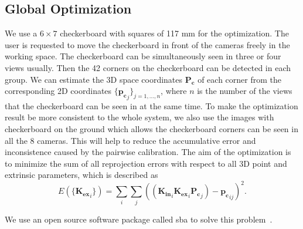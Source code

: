 \documentclass{article}
\begin{document}
\subsection{Global Optimization}

We use a $6\times7$ checkerboard with squares of 117 mm for the optimization. The user is requested to move the checkerboard in front of the cameras freely in the working space. The checkerboard can be simultaneously seen in three or four views usually. Then the 42 corners on the checkerboard can be detected in each group. We can estimate the 3D space coordinates $\mathbf{P_{c}}$ of each corner from the corresponding 2D coordinates $\{\mathbf{p_{c}}_{j}\}_{j=1,...,n}$, where $n$ is the number of the views that the checkerboard can be seen in at the same time. To make the optimization result be more consistent to the whole system, we also use the images with checkerboard on the ground which allows the checkerboard corners can be seen in all the 8 cameras. This will help to reduce the accumulative error and inconsistence caused by the pairwise calibration. The aim of the optimization is to minimize the sum of all reprojection errors with respect to all 3D point and extrinsic parameters, which is described as
\begin{equation}
E(\{\mathbf{K_{ex}}_{i}\})=\sum_{i}\sum_{j}((\mathbf{K_{in}}_{i}\mathbf{K_{ex}}_{i}\mathbf{P_{c}}_{j})-\mathbf{p_{c}}_{ij})^{2}.
\end{equation}

We use an open source software package called sba to solve this problem~\cite{lour09}.
\end{document}
